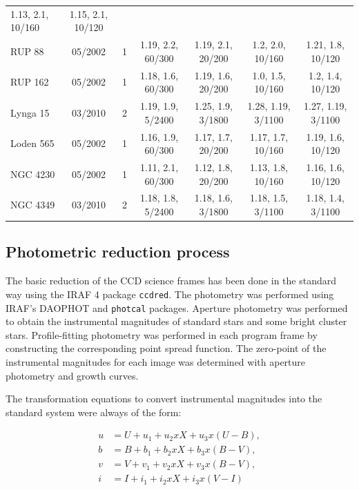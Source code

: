 \documentclass[referee]{aa}
\begin{document}
\begin{table}[ht]
\begin{tabular}{lcccccc}
        1.13, 2.1, 10/160 & 1.15, 2.1, 10/120\\
        RUP 88    & 05/2002 & 1 & 1.19, 2.2, 60/300 & 1.19, 2.1, 20/200 &
        1.2, 2.0, 10/160 & 1.21, 1.8, 10/120\\
        RUP 162   & 05/2002 & 1 & 1.18, 1.6, 60/300 & 1.19, 1.6, 20/200 &
        1.0, 1.5, 10/160 & 1.2, 1.4, 10/120\\
        Lynga 15  & 03/2010 & 2 & 1.19, 1.9, 5/2400 & 1.25, 1.9, 3/1800 &
        1.28, 1.19, 3/1100 & 1.27, 1.19, 3/1100\\
        Loden 565 & 05/2002 & 1 & 1.16, 1.9, 60/300 & 1.17, 1.7, 20/200 &
        1.17, 1.7, 10/160 & 1.19, 1.6, 10/120\\
        NGC 4230  & 05/2002 & 1 & 1.11, 2.1, 60/300 & 1.12, 1.8, 20/200 &
        1.13, 1.8, 10/160 & 1.16, 1.6, 10/120\\
        NGC 4349  & 03/2010 & 2 & 1.18, 1.8, 5/2400 & 1.18, 1.6, 3/1800 &
        1.18, 1.5, 3/1100 & 1.18, 1.4, 3/1100\\
        \hline
    \end{tabular}
    \label{tab:log_yalo}
\end{table}




\subsection{Photometric reduction process}
\label{ssec:photom_reduc}

The basic reduction of the CCD science frames has been done in the standard way
using the IRAF 4 package \texttt{ccdred}. The photometry was performed using
IRAF's DAOPHOT \citep{Stetson_1987,Stetson_1990} and \texttt{photcal} packages.
Aperture photometry was performed to obtain the instrumental magnitudes of
standard stars and some bright cluster stars. Profile-fitting photometry was
performed in each program frame by constructing the corresponding point spread
function. The zero-point of the instrumental magnitudes for each image was
determined with aperture photometry and growth curves.

The transformation equations to convert instrumental magnitudes into the
standard system were always of the form:

\begin{equation}
\begin{aligned}
  u  &=  U+u_1+u_2xX+u_3x(U-B), \\
  b  &=  B+b_1+b_2xX+b_3x(B-V), \\
  v  &=  V+v_1+v_2xX+v_3x(B-V), \\
  i  &=  I+i_1+i_2xX+i_3x(V-I)
\end{aligned}
\end{equation}
\end{document}
